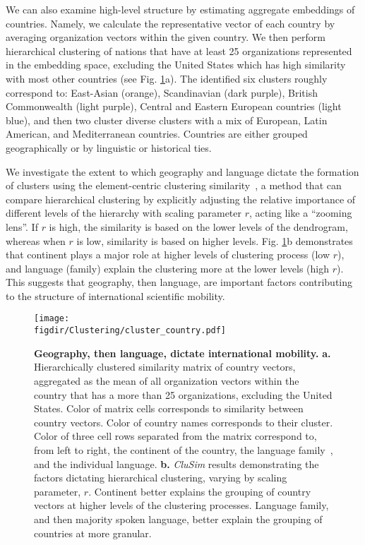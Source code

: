 \documentclass[12pt]{article} %
\def\figdir{../Figs}
\begin{document}
We can also examine high-level structure by estimating aggregate embeddings of countries. 
Namely, we calculate the representative vector of each country by averaging organization vectors within the given country.
We then perform hierarchical clustering of nations that have at least 25 organizations represented in the embedding space, excluding the United States which has high similarity with most other countries (see Fig. \ref{fig:clustering}a). 
The identified six clusters roughly correspond to: East-Asian (orange), Scandinavian (dark purple), British Commonwealth (light purple), Central and Eastern European countries (light blue), and then two cluster diverse clusters with a mix of European, Latin American, and Mediterranean countries.
Countries are either grouped geographically or by linguistic or historical ties. 

We investigate the extent to which geography and language dictate the formation of clusters using the element-centric clustering similarity~\autocite{gates2019element}, a method that can compare hierarchical clustering by explicitly adjusting the relative importance of different levels of the hierarchy with scaling parameter $r$, acting like a ``zooming lens''.
If $r$ is high, the similarity is based on the lower levels of the dendrogram, whereas when $r$ is low, similarity is based on higher levels.
Fig. \ref{fig:clustering}b demonstrates that continent plays a major role at higher levels of clustering process (low $r$), and language (family) explain the clustering more at the lower levels (high $r$).
This suggests that geography, then language, are important factors contributing to the structure of international scientific mobility.

%
%
\begin{figure}[p!]
	\centering
	\texttt{[image: \\figdir/Clustering/cluster\_country.pdf]}
	\caption{
		\textbf{Geography, then language, dictate international mobility.}
		\textbf{a.} Hierarchically clustered similarity matrix of country vectors, aggregated as the mean of all organization vectors within the country that has a more than 25 organizations, excluding the United States.
		Color of matrix cells corresponds to similarity between country vectors.
		Color of country names corresponds to their cluster.
		Color of three cell rows separated from the matrix correspond to, from left to right, the continent of the country, the language family~\autocite{ethnologue}, and the individual language.
		\textbf{b.}	\textit{CluSim} \autocite{gates2019element} results demonstrating the factors dictating hierarchical clustering, varying by scaling parameter, $r$.
		Continent better explains the grouping of country vectors at higher levels of the clustering processes.
		Language family, and then majority spoken language, better explain the grouping of countries at more granular.
	}
	\label{fig:clustering}
\end{figure}
\end{document}

